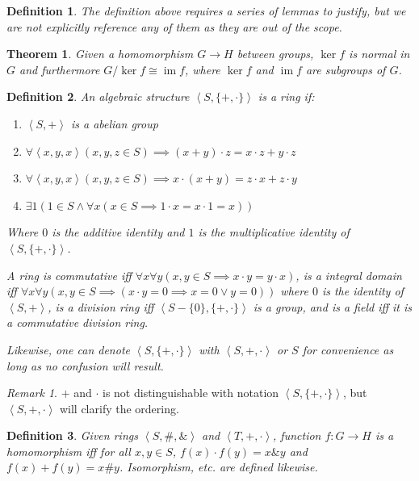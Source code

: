 \documentclass{book}
\newtheorem{definition}{Definition}
\newtheorem{theorem}{Theorem}
\theoremstyle{definition}\newtheorem{mechanism}{Mechanism}
\theoremstyle{remark}\newtheorem*{remark}{Remark}
\DeclareMathOperator*{\im}{im}
\begin{document}
\begin{definition}
	The definition above requires a series of lemmas to justify, but we are not explicitly reference any of them as they are out of the scope.
\end{definition}

\begin{theorem}
	Given a homomorphism $G\to H$ between groups, $\ker f$ is normal in $G$ and furthermore $G / \ker f\cong \im f$, where $\ker f$ and $\im f$ are subgroups of $G$.
\end{theorem}

\begin{definition}
	An algebraic structure $\left<S, \{+, \cdot\}\right>$ is a ring if:
	
	\begin{enumerate}
		\item $\left<S, +\right>$ is a abelian group
		\item $\forall \left<x, y, x\right>(x, y, z\in S) \implies (x + y) \cdot z = x\cdot z + y\cdot z$
		\item $\forall \left<x, y, x\right>(x, y, z\in S) \implies x\cdot (x + y) = z\cdot x + z\cdot y$
		\item $\exists 1(1\in S\land \forall x(x\in S\implies 1\cdot x = x\cdot 1 = x))$
	\end{enumerate}
	
	Where $0$ is the additive identity and $1$ is the multiplicative identity of $\left<S, \{+, \cdot\}\right>$.
	
	A ring is commutative iff $\forall x\forall y(x, y\in S\implies x\cdot y = y\cdot x)$, is a integral domain iff $\forall x\forall y(x, y\in S\implies (x\cdot y = 0\implies x = 0\lor y = 0))$ where $0$ is the identity of $\left<S, +\right>$, is a division ring iff $\left<S - \{0\}, \{+, \cdot\}\right>$ is a group, and is a field iff it is a commutative division ring.
	
	Likewise, one can denote $\left<S, \{+, \cdot\}\right>$ with $\left<S, +, \cdot\right>$ or $S$ for convenience as long as no confusion will result.
\end{definition}

\begin{remark}
	$+$ and $\cdot$ is not distinguishable with notation $\left<S, \{+, \cdot\}\right>$, but $\left<S, +, \cdot\right>$ will clarify the ordering.
\end{remark}

\begin{definition}
	Given rings $\left<S, \#, \&\right>$ and $\left<T, +, \cdot\right>$, function $f: G\to H$ is a homomorphism iff for all $x, y\in S$, $f(x)\cdot f(y) = x\& y$ and $f(x) + f(y) = x \# y$. Isomorphism, etc. are defined likewise.
\end{definition}
\end{document}
